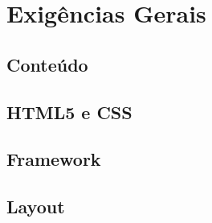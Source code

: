 \chapter{Exigências Gerais}


\section{Conteúdo}



\section{HTML5 e CSS}

     
\section{Framework}



\section{Layout}
